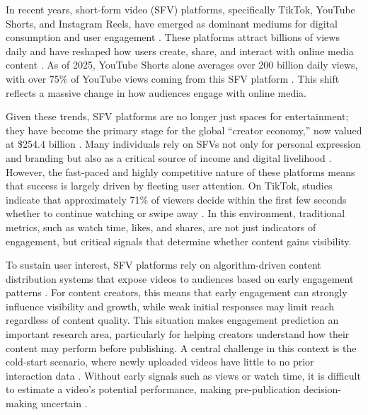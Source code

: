  

In recent years, short-form video (SFV) platforms, specifically TikTok, YouTube Shorts, and Instagram Reels, have emerged as dominant mediums for digital consumption and user engagement \cite{faverio_2025_teens}. These platforms attract billions of views daily and have reshaped how users create, share, and interact with online media content \cite{gottfried_2025_americans, lafayette_2025_the}. As of 2025, YouTube Shorts alone averages over 200 billion daily views, with over 75\% of YouTube views coming from this SFV platform \cite{cobb_2025_youtube, cassillo_2026_tube, violot2024shorts}. This shift reflects a massive change in how audiences engage with online media.

Given these trends, SFV platforms are no longer just spaces for entertainment; they have become the primary stage for the global ``creator economy,'' now valued at \$254.4 billion \cite{zoting_2026_creator}. Many individuals rely on SFVs not only for personal expression and branding but also as a critical source of income and digital livelihood \cite{violot2024shorts, varanasi_2025_tiktok}. However, the fast-paced and highly competitive nature of these platforms means that success is largely driven by fleeting user attention. On TikTok, studies indicate that approximately 71\% of viewers decide within the first few seconds whether to continue watching or swipe away \cite{eyesee_2023_tap}. In this environment, traditional metrics, such as watch time, likes, and shares, are not just indicators of engagement, but critical signals that determine whether content gains visibility.

To sustain user interest, SFV platforms rely on algorithm-driven content distribution systems that expose videos to audiences based on early engagement patterns \cite{covington2016deep}. For content creators, this means that early engagement can strongly influence visibility and growth, while weak initial responses may limit reach regardless of content quality. This situation makes engagement prediction an important research area, particularly for helping creators understand how their content may perform before publishing. A central challenge in this context is the cold-start scenario, where newly uploaded videos have little to no prior interaction data \cite{li2024delving}. Without early signals such as views or watch time, it is difficult to estimate a video’s potential performance, making pre-publication decision-making uncertain \cite{lika2014facing}.


